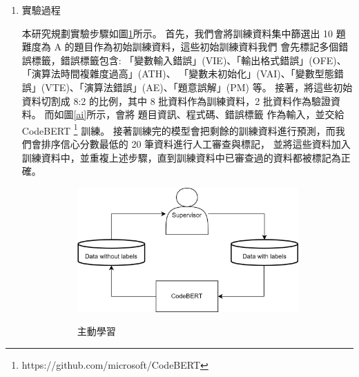 \documentclass[12pt]{article}
\begin{document}
\begin{enumerate}
\begin{enumerate}
\begin{enumerate}[label=(\arabic*)]
              我們會把這些程式碼分為正確的和錯誤的兩類，比例為 1:9。
            \item 實驗過程
              \par 本研究規劃實驗步驟如圖\ref{ai2}所示。
              首先，我們會將訓練資料集中篩選出 10 題難度為 A 的題目作為初始訓練資料，這些初始訓練資料我們
              會先標記多個錯誤標籤，錯誤標籤包含: 「變數輸入錯誤」(VIE)、「輸出格式錯誤」(OFE)、「演算法時間複雜度過高」(ATH)、
              「變數未初始化」(VAI)、「變數型態錯誤」(VTE)、「演算法錯誤」(AE)、「題意誤解」(PM) 等。
              接著，將這些初始資料切割成 8:2 的比例，其中 8 批資料作為訓練資料，2 批資料作為驗證資料。
              而如圖\ref{ai}所示，會將 題目資訊、程式碼、錯誤標籤 作為輸入，並交給 CodeBERT \footnote{https://github.com/microsoft/CodeBERT} 訓練。
              接著訓練完的模型會把剩餘的訓練資料進行預測，而我們會排序信心分數最低的 20 筆資料進行人工審查與標記，
              並將這些資料加入訓練資料中，並重複上述步驟，直到訓練資料中已審查過的資料都被標記為正確。
              \begin{figure}[H]
                \centering
                \begin{subfigure}{0.3\linewidth}
                  \centering
                  \href{https://raw.githubusercontent.com/programingtw/proglearn-plan/main/img/ai2.jpg}{
                    \includegraphics[width=\textwidth]{./img/ai2.jpg}
                  }
                  \caption{主動學習}
                  \label{ai2}
                \end{subfigure}
                \begin{subfigure}{0.3\linewidth}
                  \centering
                  \href{https://raw.githubusercontent.com/programingtw/proglearn-plan/main/img/ai.jpg}{
}
\end{subfigure}
\end{figure}
\end{enumerate}
\end{enumerate}
\end{enumerate}
\end{document}
